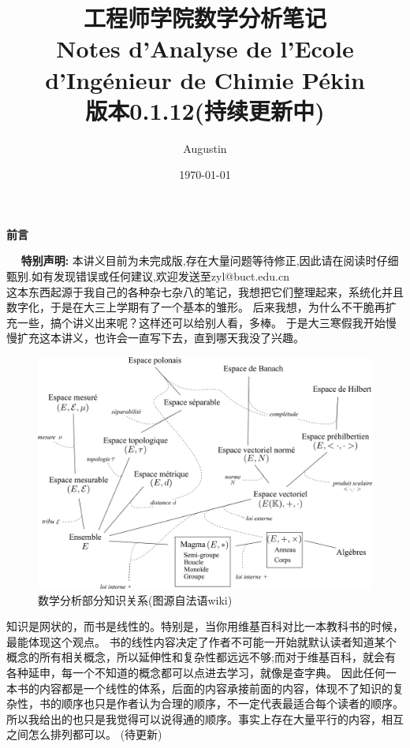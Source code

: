 \documentclass[12pt, a4paper, oneside]{ctexbook}
\title{{\Huge{\textbf{工程师学院数学分析笔记\\Notes d'Analyse de l'Ecole d'Ingénieur de Chimie Pékin}}}\\
版本0.1.12(持续更新中)}
\author{Augustin}
\date{\today}
\begin{document}
\maketitle

\setcounter{page}{1}

\begin{center}
    \Huge\textbf{前言}
\end{center}~\
\noindent
\textbf{特别声明:}
本讲义目前为未完成版,存在大量问题等待修正,因此请在阅读时仔细甄别.如有发现错误或任何建议,欢迎发送至zyl@buct.edu.cn\\


\indent
这本东西起源于我自己的各种杂七杂八的笔记，我想把它们整理起来，系统化并且数字化，于是在大三上学期有了一个基本的雏形。
后来我想，为什么不干脆再扩充一些，搞个讲义出来呢？这样还可以给别人看，多棒。
于是大三寒假我开始慢慢扩充这本讲义，也许会一直写下去，直到哪天我没了兴趣。

\begin{figure}[H]%
  \centering
  \includegraphics[scale=0.5]{abstract.png}
  \caption{数学分析部分知识关系(图源自法语wiki)}
  \label{myref:abstract}
\end{figure}

知识是网状的，而书是线性的。特别是，当你用维基百科对比一本教科书的时候，最能体现这个观点。
书的线性内容决定了作者不可能一开始就默认读者知道某个概念的所有相关概念，所以延伸性和复杂性都远远不够;而对于维基百科，就会有各种延申，每一个不知道的概念都可以点进去学习，就像是查字典。
因此任何一本书的内容都是一个线性的体系，后面的内容承接前面的内容，体现不了知识的复杂性，书的顺序也只是作者认为合理的顺序，不一定代表最适合每个读者的顺序。
所以我给出的也只是我觉得可以说得通的顺序。事实上存在大量平行的内容，相互之间怎么排列都可以。
(待更新)
\end{document}
